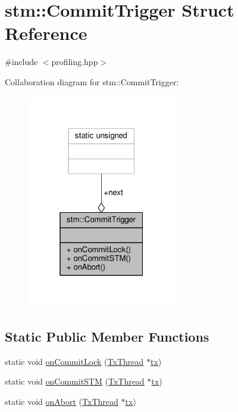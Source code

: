 \hypertarget{structstm_1_1CommitTrigger}{\section{stm\-:\-:Commit\-Trigger Struct Reference}
\label{structstm_1_1CommitTrigger}
}


{\ttfamily \#include $<$profiling.\-hpp$>$}



Collaboration diagram for stm\-:\-:Commit\-Trigger\-:
\nopagebreak
\begin{figure}[H]
\begin{center}
\leavevmode
\includegraphics[width=184pt]{structstm_1_1CommitTrigger__coll__graph}
\end{center}
\end{figure}
\subsection*{Static Public Member Functions}
\begin{DoxyCompactItemize}
\item 
static void \hyperlink{structstm_1_1CommitTrigger_a4d706454d226b9100a972d36bb3be88e}{on\-Commit\-Lock} (\hyperlink{structstm_1_1TxThread}{Tx\-Thread} $\ast$\hyperlink{stmskip_8cc_a0f1c58699b83ce5a08bd9ee859250d72}{tx})
\item 
static void \hyperlink{structstm_1_1CommitTrigger_acdf3280966d01d057c2efc8ff1792aab}{on\-Commit\-S\-T\-M} (\hyperlink{structstm_1_1TxThread}{Tx\-Thread} $\ast$\hyperlink{stmskip_8cc_a0f1c58699b83ce5a08bd9ee859250d72}{tx})
\item 
static void \hyperlink{structstm_1_1CommitTrigger_aee144a92ac151fa1aae6942b04f68685}{on\-Abort} (\hyperlink{structstm_1_1TxThread}{Tx\-Thread} $\ast$\hyperlink{stmskip_8cc_a0f1c58699b83ce5a08bd9ee859250d72}{tx})
\end{DoxyCompactItemize}

